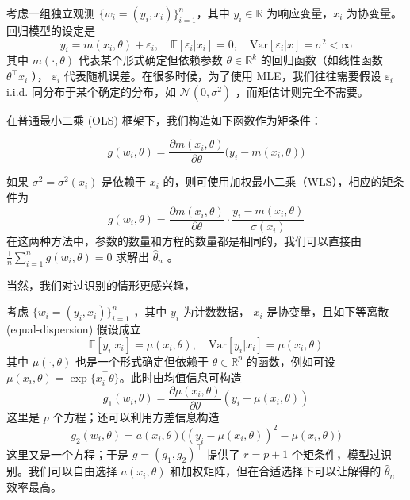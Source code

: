\begin{remark}
\begin{example}[最小二乘法]
考虑一组独立观测 $\{ w_i=(y_i, x_i)\}_{i=1}^n$，其中 $y_i \in \mathbb{R}$ 为响应变量，$x_i$ 为协变量。回归模型的设定是 \[ y_i = m(x_i, \theta) + \varepsilon_i,\quad \mathbb{E}[\varepsilon_i | x_i] = 0,\quad \mathrm{Var}[\varepsilon_i | x]= \sigma^2 < \infty \]其中 $m(\cdot,\theta)$ 代表某个形式确定但依赖参数 $\theta\in\mathbb R^k$ 的回归函数（如线性函数 $\theta^\top x_i$ ）， $\varepsilon_i$ 代表随机误差。在很多时候，为了使用 MLE，我们往往需要假设 $\varepsilon_i$ i.i.d. 同分布于某个确定的分布，如 $\mathcal N(0,\sigma^2)$ ，而矩估计则完全不需要。

在普通最小二乘 (OLS) 框架下，我们构造如下函数作为矩条件： 

$$g(w_i, \theta) = \frac{\partial m(x_i, \theta)}{\partial \theta} \bigl(y_i - m(x_i, \theta)\bigr)$$

如果 $\sigma^2=\sigma^2(x_i)$ 是依赖于 $x_i$ 的，则可使用加权最小二乘（WLS），相应的矩条件为 \[ g(w_i, \theta) = \frac{\partial m(x_i, \theta)}{\partial \theta} \cdot \frac{y_i - m(x_i, \theta)}{\sigma(x_i)} \]在这两种方法中，参数的数量和方程的数量都是相同的，我们可以直接由 $\frac1n\sum_{i=1}^ng(w_i,\theta)=0$ 求解出 $\widehat\theta_n$ 。

\end{example}

当然，我们对过识别的情形更感兴趣，


\begin{example}[Poisson 回归]
考虑 $\{ w_i=(y_i, x_i)\}_{i=1}^n$ ，其中 $y_i$ 为计数数据， $x_i$ 是协变量，且如下等离散 (equal-dispersion) 假设成立
\[ \mathbb{E}[y_i|x_i] = \mu(x_i,\theta),\quad \mathrm{Var}[y_i|x_i] = \mu(x_i,\theta) \]其中 $\mu(\cdot,\theta)$ 也是一个形式确定但依赖于 $\theta\in\mathbb R^p$ 的函数，例如可设 $\mu(x_i,\theta) = \exp\{x_i^\top\theta\}$。此时由均值信息可构造
\[g_1(w_i,\theta) = \frac{\partial \mu(x_i,\theta)}{\partial\theta} (y_i - \mu(x_i,\theta))\]
这里是 $p$ 个方程；还可以利用方差信息构造
\[g_2(w_i,\theta) = a(x_i,\theta)\bigl( (y_i - \mu(x_i,\theta))^2 - \mu(x_i,\theta) \bigr)\]
这里又是一个方程；于是 $g = (g_1, g_2)^\top$ 提供了 $r=p+1$ 个矩条件，模型过识别。我们可以自由选择 $a(x_i,\theta)$ 和加权矩阵，但在合适选择下可以让解得的 $\widehat\theta_n$ 效率最高。




\end{example}



\end{remark}
